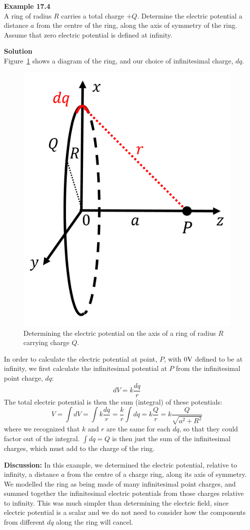 \begin{framed}
\textbf{Example 17.4}\\
A ring of radius $R$ carries a total charge $+Q$. Determine the electric potential a distance $a$ from the centre of the ring, along the axis of symmetry of the ring. Assume that zero electric potential is defined at infinity.

\begin{framed}
\textbf{Solution}\\
Figure~\ref{fig:potential:ring} shows a diagram of the ring, and our choice of infinitesimal charge, $dq$.

\begin{figure}[!htbp]
\centering
\includegraphics[width=0.3\linewidth]{files/ring-0d66df454bf3b2c8ce93155a3488ea0e.png}
\caption[]{Determining the electric potential on the axis of a ring of radius $R$ carrying charge $Q$.}
\label{fig:potential:ring}
\end{figure}

In order to calculate the electric potential at point, $P$, with $0 {\rm V}$ defined to be at infinity, we first calculate the infinitesimal potential at $P$ from the infinitesimal point charge, $dq$:
\begin{equation}
dV=k\frac{dq}{r}
\end{equation}
The total electric potential is then the sum (integral) of these potentials:
\begin{equation}
V=\int dV=\int k\frac{dq}{r} = \frac{k}{r}\int dq=k\frac{Q}{r}=k\frac{Q}{\sqrt{a^2+R^2}}
\end{equation}
where we recognized that $k$ and $r$ are the same for each $dq$, so that they could factor out of the integral. $\int dq=Q$ is then just the sum of the infinitesimal charges, which must add to the charge of the ring.

\textbf{Discussion:} In this example, we determined the electric potential, relative to infinity, a distance $a$ from the centre of a charge ring, along its axis of symmetry. We modelled the ring as being made of many infinitesimal point charges, and summed together the infinitesimal electric potentials from those charges relative to infinity. This was much simpler than determining the electric field, since electric potential is a scalar and we do not need to consider how the components from different $dq$ along the ring will cancel.
\end{framed}
\end{framed}

